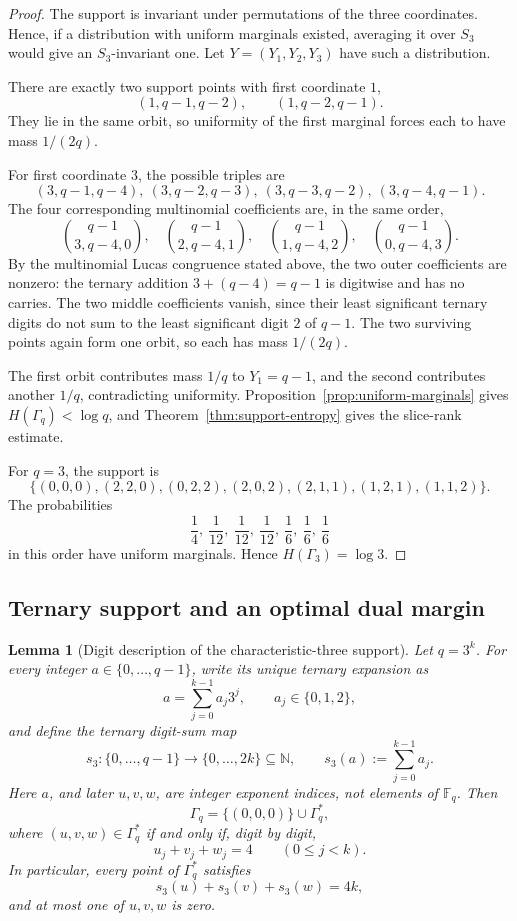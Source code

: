 \documentclass[10pt,a4paper]{amsart}
\newtheorem{lemma}[theorem]{Lemma}
\theoremstyle{definition}
\newcommand{\F}{\mathbb F}
\newcommand{\1}{\mathbf 1}
\begin{document}
\begin{proof}
The support is invariant under permutations of the three coordinates.  Hence, if a distribution with uniform marginals existed, averaging it over $S_3$ would give an $S_3$-invariant one.  Let $Y=(Y_1,Y_2,Y_3)$ have such a distribution.

There are exactly two support points with first coordinate $1$,
\[
 (1,q-1,q-2),\qquad(1,q-2,q-1).
\]
They lie in the same orbit, so uniformity of the first marginal forces each to have mass $1/(2q)$.

For first coordinate $3$, the possible triples are
\[
 (3,q-1,q-4),\ (3,q-2,q-3),\ (3,q-3,q-2),\ (3,q-4,q-1).
\]
The four corresponding multinomial coefficients are, in the same order,
\[
 \binom{q-1}{3,q-4,0},\quad
 \binom{q-1}{2,q-4,1},\quad
 \binom{q-1}{1,q-4,2},\quad
 \binom{q-1}{0,q-4,3}.
\]
By the multinomial Lucas congruence stated above, the two outer coefficients are nonzero: the ternary addition $3+(q-4)=q-1$ is digitwise and has no carries.  The two middle coefficients vanish, since their least significant ternary digits do not sum to the least significant digit $2$ of $q-1$.  The two surviving points again form one orbit, so each has mass $1/(2q)$.

The first orbit contributes mass $1/q$ to $Y_1=q-1$, and the second contributes another $1/q$, contradicting uniformity.  Proposition~\ref{prop:uniform-marginals} gives $H(\Gamma_q)<\log q$, and Theorem~\ref{thm:support-entropy} gives the slice-rank estimate.

For $q=3$, the support is
\[
 \{(0,0,0),(2,2,0),(0,2,2),(2,0,2),(2,1,1),(1,2,1),(1,1,2)\}.
\]
The probabilities
\[
 \frac14,\ \frac1{12},\ \frac1{12},\ \frac1{12},\ \frac16,\ \frac16,\ \frac16
\]
in this order have uniform marginals.  Hence $H(\Gamma_3)=\log3$.
\end{proof}

\subsection{Ternary support and an optimal dual margin}

\begin{lemma}[Digit description of the characteristic-three support]\label{lem:q3-digit-support}
Let $q=3^k$.  For every integer $a\in\{0,\ldots,q-1\}$, write its unique ternary expansion as
\[
 a=\sum_{j=0}^{k-1}a_j3^j,
 \qquad a_j\in\{0,1,2\},
\]
and define the ternary digit-sum map
\[
 s_3:\{0,\ldots,q-1\}\longrightarrow\{0,\ldots,2k\}\subseteq\mathbb N,
 \qquad
 s_3(a):=\sum_{j=0}^{k-1}a_j.
\]
Here $a$, and later $u,v,w$, are integer exponent indices, not elements of $\F_q$.  Then
\[
 \Gamma_q=\{(0,0,0)\}\cup\Gamma_q^\ast,
\]
where $(u,v,w)\in\Gamma_q^\ast$ if and only if, digit by digit,
\[
 u_j+v_j+w_j=4
 \qquad(0\le j<k).
\]
In particular, every point of $\Gamma_q^\ast$ satisfies
\[
 s_3(u)+s_3(v)+s_3(w)=4k,
\]
and at most one of $u,v,w$ is zero.
\end{lemma}
\end{document}

